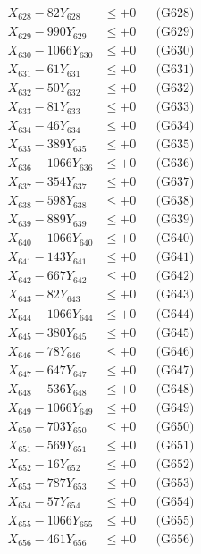 \documentclass[a4paper,10pt]{article}
\begin{document}
{\begin{align}
X_{628} - 82Y_{628} &\leq +0 && \text{(G628)} \\
X_{629} - 990Y_{629} &\leq +0 && \text{(G629)} \\
X_{630} - 1066Y_{630} &\leq +0 && \text{(G630)} \\
\allowbreak
X_{631} - 61Y_{631} &\leq +0 && \text{(G631)} \\
X_{632} - 50Y_{632} &\leq +0 && \text{(G632)} \\
X_{633} - 81Y_{633} &\leq +0 && \text{(G633)} \\
X_{634} - 46Y_{634} &\leq +0 && \text{(G634)} \\
X_{635} - 389Y_{635} &\leq +0 && \text{(G635)} \\
X_{636} - 1066Y_{636} &\leq +0 && \text{(G636)} \\
X_{637} - 354Y_{637} &\leq +0 && \text{(G637)} \\
X_{638} - 598Y_{638} &\leq +0 && \text{(G638)} \\
X_{639} - 889Y_{639} &\leq +0 && \text{(G639)} \\
X_{640} - 1066Y_{640} &\leq +0 && \text{(G640)} \\
\allowbreak
X_{641} - 143Y_{641} &\leq +0 && \text{(G641)} \\
X_{642} - 667Y_{642} &\leq +0 && \text{(G642)} \\
X_{643} - 82Y_{643} &\leq +0 && \text{(G643)} \\
X_{644} - 1066Y_{644} &\leq +0 && \text{(G644)} \\
X_{645} - 380Y_{645} &\leq +0 && \text{(G645)} \\
X_{646} - 78Y_{646} &\leq +0 && \text{(G646)} \\
X_{647} - 647Y_{647} &\leq +0 && \text{(G647)} \\
X_{648} - 536Y_{648} &\leq +0 && \text{(G648)} \\
X_{649} - 1066Y_{649} &\leq +0 && \text{(G649)} \\
X_{650} - 703Y_{650} &\leq +0 && \text{(G650)} \\
\allowbreak
X_{651} - 569Y_{651} &\leq +0 && \text{(G651)} \\
X_{652} - 16Y_{652} &\leq +0 && \text{(G652)} \\
X_{653} - 787Y_{653} &\leq +0 && \text{(G653)} \\
X_{654} - 57Y_{654} &\leq +0 && \text{(G654)} \\
X_{655} - 1066Y_{655} &\leq +0 && \text{(G655)} \\
X_{656} - 461Y_{656} &\leq +0 && \text{(G656)} \\

\end{align}}
\end{document}
